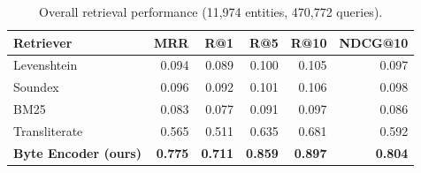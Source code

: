 \begin{table}
\caption{Overall retrieval performance (11,974 entities, 470,772 queries).}
\label{tab:overall}
\begin{tabular}{lrrrrr}
\toprule
Retriever & MRR & R@1 & R@5 & R@10 & NDCG@10 \\
\midrule
Levenshtein & 0.094 & 0.089 & 0.100 & 0.105 & 0.097 \\
Soundex & 0.096 & 0.092 & 0.101 & 0.106 & 0.098 \\
BM25 & 0.083 & 0.077 & 0.091 & 0.097 & 0.086 \\
Transliterate & 0.565 & 0.511 & 0.635 & 0.681 & 0.592 \\
\textbf{Byte Encoder (ours)} & \textbf{0.775} & \textbf{0.711} & \textbf{0.859} & \textbf{0.897} & \textbf{0.804} \\
\bottomrule
\end{tabular}
\end{table}
